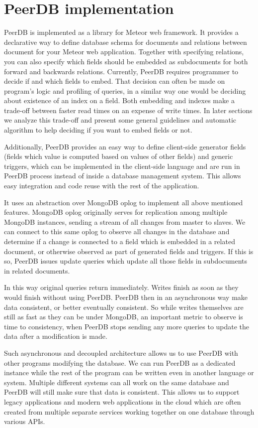 \section{PeerDB implementation}

PeerDB is implemented as a library for Meteor web framework.
It provides a declarative way to define database schema for documents and relations between document for your Meteor web application.
Together with specifying relations, you can also specify which fields should be embedded as subdocuments for both forward and backwards relations.
Currently, PeerDB requires programmer to decide if and which fields to embed.
That decision can often be made on program's logic and profiling of queries, in a similar way one would be deciding about existence of an index on a field.
Both embedding and indexes make a trade-off between faster read times on an expense of write times.
In later sections we analyze this trade-off and present some general guidelines and automatic algorithm to help deciding if you want to embed fields or not.

Additionally, PeerDB provides an easy way to define client-side generator fields (fields which value is computed based on values of other fields) and generic triggers, which can be implemented in the client-side language and are run in PeerDB process instead of inside a database management system. This allows easy integration and code reuse with the rest of the application.

It uses an abstraction over MongoDB oplog to implement all above mentioned features.
MongoDB oplog originally serves for replication among multiple MongoDB instances, sending a stream of all changes from master to slaves.
We can connect to this same oplog to observe all changes in the database and determine if a change is connected to a field which is embedded in a related document, or otherwise observed as part of generated fields and triggers.
If this is so, PeerDB issues update queries which update all those fields in subdocuments in related documents.

In this way original queries return immediately.
Writes finish as soon as they would finish without using PeerDB.
PeerDB then in an asynchronous way make data consistent, or better eventually consistent.
So while writes themselves are still as fast as they can be under MongoDB, an important metric to observe is time to consistency, when PeerDB stops sending any more queries to update the data after a modification is made.

Such asynchronous and decoupled architecture allows us to use PeerDB with other programs modifying the database.
We can run PeerDB as a dedicated instance while the rest of the program can be written even in another language or system.
Multiple different systems can all work on the same database and PeerDB will still make sure that data is consistent.
This allows us to support legacy applications and modern web applications in the cloud which are often created from multiple separate services working together on one database through various APIs.

